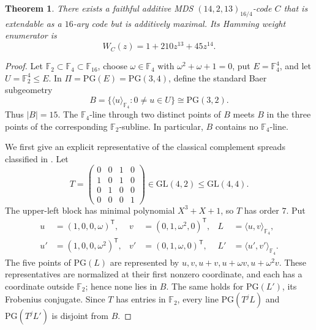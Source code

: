 \documentclass[11pt]{amsart}
\newtheorem{theorem}{Theorem}
\theoremstyle{remark}
\newcommand{\F}{\mathbb F}
\newcommand{\PG}{\mathrm{PG}}
\begin{document}
\begin{theorem}\label{thm:main}
There exists a faithful additive MDS $(14,2,13)_{16/4}$-code $C$ that is
extendable as a $16$-ary code but is additively maximal. Its Hamming weight
enumerator is
\[
  W_C(z)=1+210z^{13}+45z^{14}.
\]
\end{theorem}

\begin{proof}
Let $\F_2\subset\F_4\subset\F_{16}$, choose
$\omega\in\F_4$ with $\omega^2+\omega+1=0$, put $E=\F_4^4$, and let
$U=\F_2^4\le E$. In $\Pi=\PG(E)=\PG(3,4)$, define the standard Baer
subgeometry
\[
  B=\{\langle u\rangle_{\F_4}:0\ne u\in U\}\cong\PG(3,2).
\]
Thus $|B|=15$. The $\F_4$-line through two distinct points of $B$ meets
$B$ in the three points of the corresponding $\F_2$-subline. In
particular, $B$ contains no $\F_4$-line.

We first give an explicit representative of the classical complement
spreads classified in \cite{vanDam,Mellinger}. Let
\[
 T=\begin{pmatrix}
     0&0&1&0\\
     1&0&1&0\\
     0&1&0&0\\
     0&0&0&1
   \end{pmatrix}\in\mathrm{GL}(4,2)\le\mathrm{GL}(4,4).
\]
The upper-left block has minimal polynomial $X^3+X+1$, so $T$ has order
$7$. Put
\[
\begin{aligned}
 u&=(1,0,0,\omega)^{\mathsf T},
 &v&=(0,1,\omega^2,0)^{\mathsf T},
 &L&=\langle u,v\rangle_{\F_4},\\
 u'&=(1,0,0,\omega^2)^{\mathsf T},
 &v'&=(0,1,\omega,0)^{\mathsf T},
 &L'&=\langle u',v'\rangle_{\F_4}.
\end{aligned}
\]
The five points of $\PG(L)$ are represented by
$u,v,u+v,u+\omega v,u+\omega^2v$. These representatives are normalized
at their first nonzero coordinate, and each has a coordinate outside
$\F_2$; hence none lies in $B$. The same holds for $\PG(L')$, its
Frobenius conjugate. Since $T$ has entries in $\F_2$, every line
$\PG(T^jL)$ and $\PG(T^jL')$ is disjoint from $B$.


\end{proof}
\end{document}
